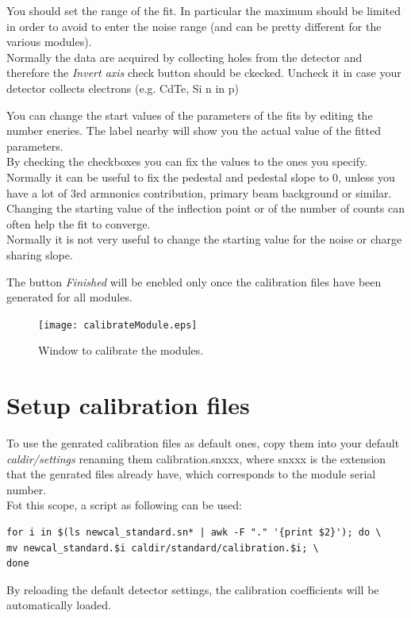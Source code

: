You should set the range of the fit. In particular the maximum should be limited in order to avoid to enter the noise range (and can be pretty different for the various modules).\\
Normally the data are acquired by collecting holes from the detector and therefore the \textit{Invert axis} check button should be ckecked. Uncheck it in case your detector collects electrons (e.g. CdTe, Si n in p)

You can change the start values of the parameters of the fits by editing the number eneries. The label nearby will show you the actual value of the fitted parameters.\\
By checking the checkboxes you can fix the values to the ones you specify.\\
Normally it can be useful to fix the pedestal and pedestal slope to 0, unless you have a lot of 3rd armnonics contribution, primary beam background or similar.\\
Changing the starting value of the inflection point or of the number of counts can often help the fit to converge.\\
Normally it is not very useful to change the starting value for the noise or charge sharing slope.

The button \textit{Finished} will be enebled only once the calibration files have been generated for all modules.


\begin{figure}
\caption{Window to calibrate the modules.} \label{fig:calibratemodule}
\texttt{[image: calibrateModule.eps]}
\end{figure} 
\newpage


\section{Setup calibration files}

To use the genrated calibration files as default ones, copy them into your default \textit{caldir/settings} renaming them calibration.snxxx, where snxxx is the extension that the genrated files already have, which corresponds to the module serial number.\\
Fot this scope, a script as following can be used:
\begin{verbatim}
for i in $(ls newcal_standard.sn* | awk -F "." '{print $2}'); do \
mv newcal_standard.$i caldir/standard/calibration.$i; \
done
\end{verbatim}

By reloading the default detector settings, the calibration coefficients will be automatically loaded.
